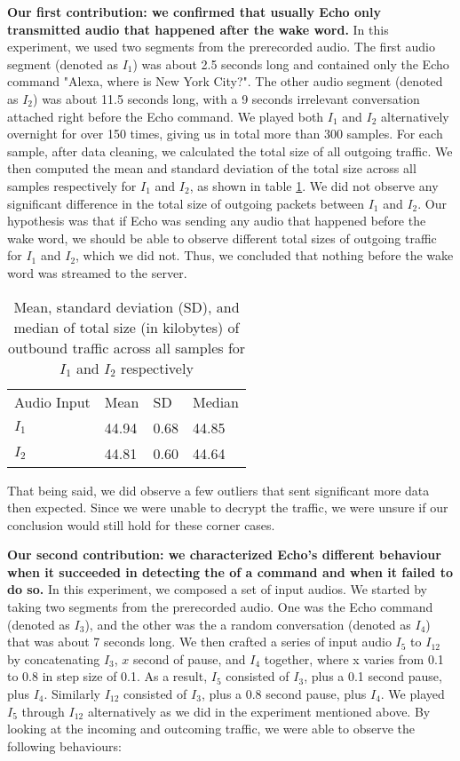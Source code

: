\textbf{Our first contribution: we confirmed that usually Echo only transmitted audio that happened after the wake word.} In this experiment, we used two segments from the prerecorded audio. The first audio segment (denoted as $I_1$) was about 2.5 seconds long and contained only the Echo command "Alexa, where is New York City?". The other audio segment (denoted as $I_2$) was about 11.5 seconds long, with a 9 seconds irrelevant conversation attached right before the Echo command. We played both $I_1$ and $I_2$ alternatively overnight for over 150 times, giving us in total more than 300 samples. For each sample, after data cleaning, we calculated the total size of all outgoing traffic. We then computed the mean and standard deviation of the total size across all samples respectively for $I_1$ and $I_2$, as shown in table \ref{table1}. We did not observe any significant difference in the total size of outgoing packets between $I_1$ and $I_2$. Our hypothesis was that if Echo was sending any audio that happened before the wake word, we should be able to observe different total sizes of outgoing traffic for $I_1$ and $I_2$, which we did not. Thus, we concluded that nothing before the wake word was streamed to the server.

\begin{table}[ht]
\caption{Mean, standard deviation (SD), and median of total size (in kilobytes) of outbound traffic across all samples for $I_1$ and $I_2$ respectively}
\begin{tabular}{l|l|l|l}
Audio Input & Mean & SD & Median \\
$I_1$ & 44.94 & 0.68 & 44.85\\
$I_2$ & 44.81 & 0.60 & 44.64\\
\end{tabular}
\label{table1}
\end{table}

That being said, we did observe a few outliers that sent significant more data then expected. Since we were unable to decrypt the traffic, we were unsure if our conclusion would still hold for these corner cases.

\textbf{Our second contribution: we characterized Echo's different behaviour when it succeeded in detecting the of a command and when it failed to do so.} In this experiment, we composed a set of input audios. We started by taking two segments from the prerecorded audio. One was the Echo command (denoted as $I_3$), and the other was the a random conversation (denoted as $I_4$) that was about 7 seconds long. We then crafted a series of input audio $I_5$ to $I_{12}$ by concatenating $I_3$, $x$ second of pause, and $I_4$ together, where x varies from 0.1 to 0.8 in step size of 0.1. As a result, $I_5$ consisted of $I_3$, plus a 0.1 second pause, plus $I_4$. Similarly $I_{12}$ consisted of $I_3$, plus a 0.8 second pause, plus $I_4$. We played $I_5$ through $I_{12}$ alternatively as we did in the experiment mentioned above. By looking at the incoming and outcoming traffic, we were able to observe the following behaviours: 


